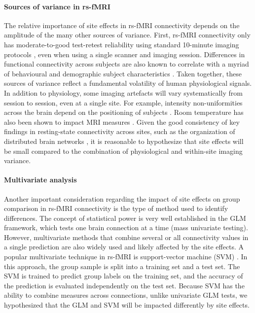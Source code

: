 \documentclass[authoryear]{elsarticle}
\begin{document}
\paragraph{Sources of variance in rs-fMRI}
The relative importance of site effects in rs-fMRI connectivity depends on the amplitude of the many other sources of variance. First, rs-fMRI connectivity only has moderate-to-good test-retest reliability using standard 10-minute imaging protocols \citep{Shehzad2009}, even when using a single scanner and imaging session. Differences in functional connectivity across subjects are also known to correlate with a myriad of behavioural and demographic subject characteristics \citep{Anand2007,Sheline2010,Kilpatrick2006}. Taken together, these sources of variance reflect a fundamental volatility of human physiological signals. In addition to physiology, some imaging artefacts will vary systematically from session to session, even at a single site. For example, intensity non-uniformities across the brain depend on the positioning of subjects \citep{Caramanos2010}. Room temperature has also been shown to impact MRI measures \citep{Vanhoutte2006}. Given the good consistency of key findings in resting-state connectivity across sites, such as the organization of distributed brain networks \citep{Biswal2010}, it is reasonable to hypothesize that site effects will be small compared to the combination of physiological and within-site imaging variance.

\paragraph{Multivariate analysis}
Another important consideration regarding the impact of site effects on group comparison in rs-fMRI connectivity is the type of method used to identify differences. The concept of statistical power is very well established in the GLM framework, which tests one brain connection at a time (mass univariate testing). However, multivariate methods that combine several or all connectivity values in a single prediction are also widely used and likely affected by the site effects. A popular multivariate technique in rs-fMRI is support-vector machine (SVM) \citep{Cortes1995}. In this approach, the group sample is split into a training set and a test set. The SVM is trained to predict group labels on the training set, and the accuracy of the prediction is evaluated independently on the test set. Because SVM has the ability to combine measures across connections, unlike univariate GLM tests, we hypothesized that the GLM and SVM will be impacted differently by site effects. 
\end{document}
